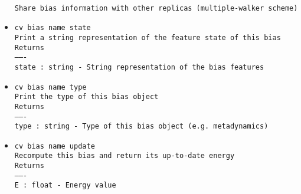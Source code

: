 \begin{itemize}
\\
\texttt{Share bias information with other replicas (multiple-walker scheme)}
\item \texttt{cv bias name state}
\\
\texttt{Print a string representation of the feature state of this bias}
\\
\texttt{Returns}
\\
\texttt{-------}
\\
\texttt{state : string - String representation of the bias features}
\item \texttt{cv bias name type}
\\
\texttt{Print the type of this bias object}
\\
\texttt{Returns}
\\
\texttt{-------}
\\
\texttt{type : string - Type of this bias object (e.g. metadynamics)}
\item \texttt{cv bias name update}
\\
\texttt{Recompute this bias and return its up-to-date energy}
\\
\texttt{Returns}
\\
\texttt{-------}
\\
\texttt{E : float - Energy value}
\end{itemize}
